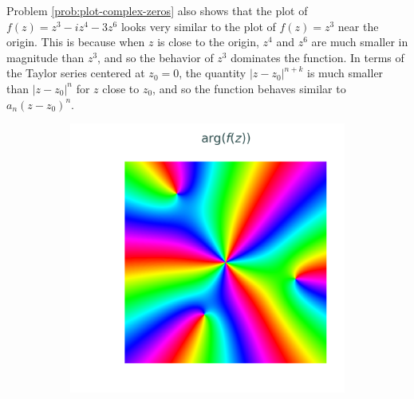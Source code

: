 Problem \ref{prob:plot-complex-zeros} also shows that the plot of $f(z) = z^3 - iz^4 - 3z^6$ looks very similar to the plot of $f(z) = z^3$ near the origin.
This is because when $z$ is close to the origin, $z^4$ and $z^6$ are much smaller in magnitude than $z^3$, and so the behavior of $z^3$ dominates the function.
In terms of the Taylor series centered at $z_0 = 0$, the quantity $|z-z_0|^{n+k}$ is much smaller than $|z-z_0|^n$ for $z$ close to $z_0$, and so the function behaves similar to $a_n(z-z_0)^n$.

\begin{figure}[H] %
\captionsetup[subfigure]{justification=centering}
\centering
\begin{subfigure}{.49\textwidth}
    \centering
    \includegraphics[width=\textwidth]{figures/zeros_angle.png}
\end{subfigure}
%
\begin{subfigure}{.49\textwidth}
    \centering

\end{subfigure}
\end{figure}
